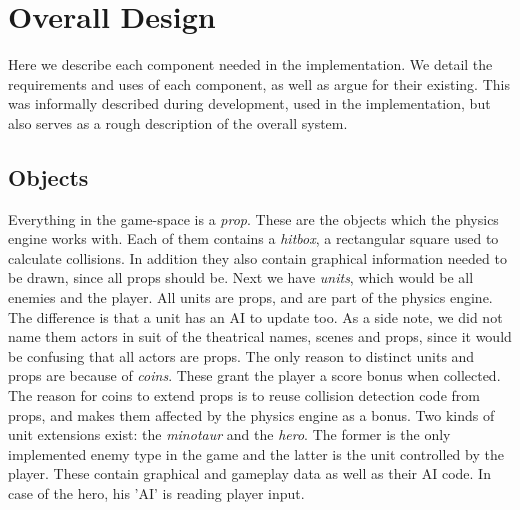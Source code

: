 \chapter{Overall Design} %
Here we describe each component needed in the implementation. We detail the requirements and uses of each component, as well as argue for their existing. This was informally described during development, used in the implementation, but also serves as a rough description of the overall system.

\section{Objects} %
Everything in the game-space is a \emph{prop}. These are the objects which the physics engine works with. Each of them contains a \emph{hitbox}, a rectangular square used to calculate collisions. In addition they also contain graphical information needed to be drawn, since all props should be.
\newline
Next we have \emph{units}, which would be all enemies and the player. All units are props, and are part of the physics engine. The difference is that a unit has an AI to update too. As a side note, we did not name them actors in suit of the theatrical names, scenes and props, since it would be confusing that all actors are props.
\newline
The only reason to distinct units and props are because of \emph{coins}. These grant the player a score bonus when collected. The reason for coins to extend props is to reuse collision detection code from props, and makes them affected by the physics engine as a bonus.
\newline
Two kinds of unit extensions exist: the \emph{minotaur} and the \emph{hero}. The former is the only implemented enemy type in the game and the latter is the unit controlled by the player. These contain graphical and gameplay data as well as their AI code. In case of the hero, his 'AI' is reading player input.

